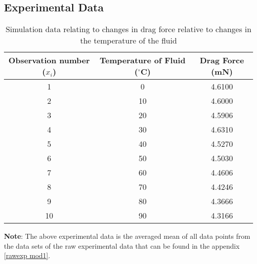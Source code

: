 

\subsection{{Experimental Data}}

	\begin{table}[H]
		\centering
		\begin{tabular}{|c|c|c|}
			\hline
			\hline
			{Observation number ($x_i$)} & {Temperature of Fluid ($^\circ$C)} & {Drag Force (mN)} \\
			\hline
			\hline
			1 & 0 & 4.6100 \\
			\hline
			2 & 10 & 4.6000 \\
			\hline
			3 & 20 & 4.5906 \\
			\hline
			4 & 30 & 4.6310 \\
			\hline
			5 & 40 & 4.5270 \\
			\hline
			6 & 50 & 4.5030 \\
			\hline
			7 & 60 & 4.4606 \\
			\hline
			8 & 70 & 4.4246 \\
			\hline
			9 & 80 & 4.3666 \\
			\hline
			10 & 90 & 4.3166 \\
			\hline
			\hline
		\end{tabular}
		\caption{{Simulation data relating to changes in drag force relative to changes in the temperature of the fluid}}
		\label{expdat}
	\end{table}

	{\textbf{Note}: The above experimental data is the averaged mean of all data points from the data sets of the raw experimental data that can be found in the appendix \ref{rawexp mod1}.}

